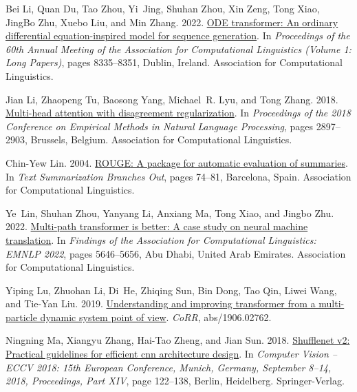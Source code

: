 \documentclass[11pt]{article}
\begin{document}
\begin{thebibliography}{49}
Bei Li, Quan Du, Tao Zhou, Yi~Jing, Shuhan Zhou, Xin Zeng, Tong Xiao, JingBo Zhu, Xuebo Liu, and Min Zhang. 2022.
\newblock \href {https://doi.org/10.18653/v1/2022.acl-long.571} {{ODE} transformer: An ordinary differential equation-inspired model for sequence generation}.
\newblock In \emph{Proceedings of the 60th Annual Meeting of the Association for Computational Linguistics (Volume 1: Long Papers)}, pages 8335--8351, Dublin, Ireland. Association for Computational Linguistics.

Jian Li, Zhaopeng Tu, Baosong Yang, Michael~R. Lyu, and Tong Zhang. 2018.
\newblock \href {https://doi.org/10.18653/v1/D18-1317} {Multi-head attention with disagreement regularization}.
\newblock In \emph{Proceedings of the 2018 Conference on Empirical Methods in Natural Language Processing}, pages 2897--2903, Brussels, Belgium. Association for Computational Linguistics.

Chin-Yew Lin. 2004.
\newblock \href {https://aclanthology.org/W04-1013} {{ROUGE}: A package for automatic evaluation of summaries}.
\newblock In \emph{Text Summarization Branches Out}, pages 74--81, Barcelona, Spain. Association for Computational Linguistics.

Ye~Lin, Shuhan Zhou, Yanyang Li, Anxiang Ma, Tong Xiao, and Jingbo Zhu. 2022.
\newblock \href {https://aclanthology.org/2022.findings-emnlp.414} {Multi-path transformer is better: A case study on neural machine translation}.
\newblock In \emph{Findings of the Association for Computational Linguistics: EMNLP 2022}, pages 5646--5656, Abu Dhabi, United Arab Emirates. Association for Computational Linguistics.

Yiping Lu, Zhuohan Li, Di~He, Zhiqing Sun, Bin Dong, Tao Qin, Liwei Wang, and Tie{-}Yan Liu. 2019.
\newblock \href {http://arxiv.org/abs/1906.02762} {Understanding and improving transformer from a multi-particle dynamic system point of view}.
\newblock \emph{CoRR}, abs/1906.02762.

Ningning Ma, Xiangyu Zhang, Hai-Tao Zheng, and Jian Sun. 2018.
\newblock \href {https://doi.org/10.1007/978-3-030-01264-9_8} {Shufflenet v2: Practical guidelines for efficient cnn architecture design}.
\newblock In \emph{Computer Vision – ECCV 2018: 15th European Conference, Munich, Germany, September 8–14, 2018, Proceedings, Part XIV}, page 122–138, Berlin, Heidelberg. Springer-Verlag.


\end{thebibliography}
\end{document}
